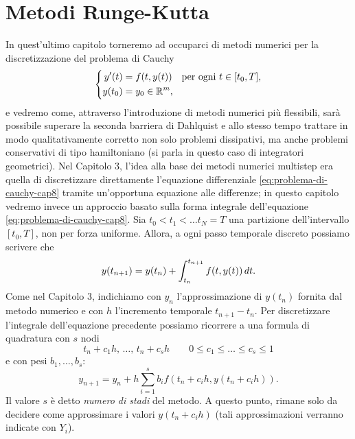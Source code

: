 \graphicspath{{./figures/capitolo8/}}
\lstset{inputpath = ./programs/capitolo8}

\chapter{Metodi Runge-Kutta}

In quest'ultimo capitolo torneremo ad occuparci di metodi numerici
per la discretizzazione del problema di Cauchy
\begin{equation} \label{eq:problema-di-cauchy-cap8}
\left\{
\begin{aligned}
y'(t)  &= f(t,y(t)) \quad \text{per ogni $t \in [t_0,T]$}, \\
y(t_0) &= y_0 \in \mathbb{R}^m,
\end{aligned}
\right.
\end{equation}
e vedremo come, attraverso l'introduzione di metodi numerici più flessibili,
sarà possibile superare la seconda barriera di Dahlquist e allo stesso
tempo trattare in modo qualitativamente corretto non solo problemi dissipativi,
ma anche problemi conservativi di tipo hamiltoniano (si parla in questo caso
di integratori geometrici). Nel Capitolo 3, l'idea alla base dei metodi numerici
multistep era quella di discretizzare direttamente l'equazione differenziale
\eqref{eq:problema-di-cauchy-cap8} tramite un'opportuna equazione alle differenze;
in questo capitolo vedremo invece un approccio basato sulla forma integrale
dell'equazione \eqref{eq:problema-di-cauchy-cap8}. Sia
$t_0 < t_1 < \dots t_N = T$ una partizione dell'intervallo $[t_0,T]$,
non per forza uniforme. Allora, a ogni passo temporale discreto
possiamo scrivere che
\[
y(t_{n+1}) = y(t_n) + \int_{t_n}^{t_{n+1}} f(t,y(t)) \, dt.
\]
Come nel Capitolo 3, indichiamo con $y_n$ l'approssimazione di $y(t_n)$
fornita dal metodo numerico e con $h$ l'incremento temporale $t_{n+1}-t_n$.
Per discretizzare l'integrale dell'equazione precedente possiamo ricorrere
a una formula di quadratura con $s$ nodi
\[
t_n + c_1 h,\, \dots,\, t_n + c_s h \qquad 0 \leq c_1 \leq \dots \leq c_s \leq 1
\]
e con pesi $b_1, \dots, b_s$:
\vspace{-1em}
\begin{equation} \label{eq:sistema-yn+1-runge-kutta}
y_{n+1} = y_n + h \sum_{i=1}^s b_i f(t_n+c_i h, y(t_n + c_i h)).
\end{equation}
Il valore $s$ è detto \emph{numero di stadi} del metodo.
A questo punto, rimane solo da decidere come approssimare i valori
$y(t_n+c_i h)$ (tali approssimazioni verranno indicate con $Y_i$).
